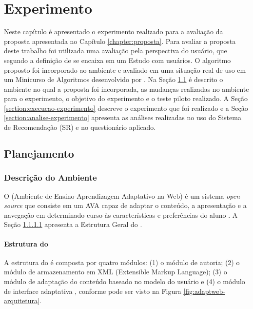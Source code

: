 \chapter{Experimento}\label{chapter:experimento}

Neste capítulo é apresentado o experimento realizado para a avaliação da proposta apresentada no Capítulo \ref{chapter:proposta}.
Para avaliar a proposta deste trabalho foi utilizada uma avaliação pela perspectiva do usuário, que segundo a definição de
 se encaixa em um Estudo com usuários. O algoritmo proposto foi incorporado ao ambiente
\adaptwebspace e avaliado em uma situação real de uso em um Minicurso de Algoritmos desenvolvido por .
Na Seção \ref{section:planejamento-experimento} é descrito o ambiente \adaptwebspace no qual a proposta foi incorporada,
as mudanças realizadas no ambiente para o experimento, o objetivo do experimento e o teste piloto realizado. A Seção
\ref{section:execucao-experimento} descreve o experimento que foi realizado e a Seção \ref{section:analise-experimento} apresenta
as análises realizadas no uso do Sistema de Recomendação (SR) e no questionário aplicado.

\section{Planejamento}\label{section:planejamento-experimento}

\subsection{Descrição do Ambiente \adaptweb}

O \adaptwebspace (Ambiente de Ensino-Aprendizagem Adaptativo na Web) é um sistema \textit{open source}
que consiste em um AVA capaz de adaptar o conteúdo, a apresentação e a navegação em determinado curso às características
e preferências do aluno \cite{gasparini2009adaptweb}. A Seção \ref{subsection:estrutura-adaptweb} apresenta a Estrutura Geral do
\adaptweb.

\subsubsection{Estrutura do \adaptweb}\label{subsection:estrutura-adaptweb}

A estrutura do \adaptwebspace é composta por quatro módulos: (1) o módulo de autoria; (2) o
módulo de armazenamento em XML (Extensible Markup Language); (3) o módulo de adaptação do conteúdo baseado no modelo do
usuário e (4) o módulo de interface adaptativa \cite{gasparini2003interface}, conforme pode ser visto na Figura
\ref{fig:adaptweb-arquitetura}.

